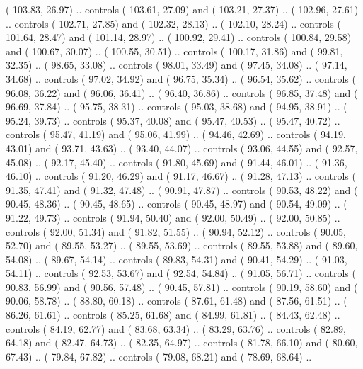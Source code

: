 {        ( 103.83,  26.97) .. controls ( 103.61,  27.09) and ( 103.21,  27.37) ..
        ( 102.96,  27.61) .. controls ( 102.71,  27.85) and ( 102.32,  28.13) ..
        ( 102.10,  28.24) .. controls ( 101.64,  28.47) and ( 101.14,  28.97) ..
        ( 100.92,  29.41) .. controls ( 100.84,  29.58) and ( 100.67,  30.07) ..
        ( 100.55,  30.51) .. controls ( 100.17,  31.86) and (  99.81,  32.35) ..
        (  98.65,  33.08) .. controls (  98.01,  33.49) and (  97.45,  34.08) ..
        (  97.14,  34.68) .. controls (  97.02,  34.92) and (  96.75,  35.34) ..
        (  96.54,  35.62) .. controls (  96.08,  36.22) and (  96.06,  36.41) ..
        (  96.40,  36.86) .. controls (  96.85,  37.48) and (  96.69,  37.84) ..
        (  95.75,  38.31) .. controls (  95.03,  38.68) and (  94.95,  38.91) ..
        (  95.24,  39.73) .. controls (  95.37,  40.08) and (  95.47,  40.53) ..
        (  95.47,  40.72) .. controls (  95.47,  41.19) and (  95.06,  41.99) ..
        (  94.46,  42.69) .. controls (  94.19,  43.01) and (  93.71,  43.63) ..
        (  93.40,  44.07) .. controls (  93.06,  44.55) and (  92.57,  45.08) ..
        (  92.17,  45.40) .. controls (  91.80,  45.69) and (  91.44,  46.01) ..
        (  91.36,  46.10) .. controls (  91.20,  46.29) and (  91.17,  46.67) ..
        (  91.28,  47.13) .. controls (  91.35,  47.41) and (  91.32,  47.48) ..
        (  90.91,  47.87) .. controls (  90.53,  48.22) and (  90.45,  48.36) ..
        (  90.45,  48.65) .. controls (  90.45,  48.97) and (  90.54,  49.09) ..
        (  91.22,  49.73) .. controls (  91.94,  50.40) and (  92.00,  50.49) ..
        (  92.00,  50.85) .. controls (  92.00,  51.34) and (  91.82,  51.55) ..
        (  90.94,  52.12) .. controls (  90.05,  52.70) and (  89.55,  53.27) ..
        (  89.55,  53.69) .. controls (  89.55,  53.88) and (  89.60,  54.08) ..
        (  89.67,  54.14) .. controls (  89.83,  54.31) and (  90.41,  54.29) ..
        (  91.03,  54.11) .. controls (  92.53,  53.67) and (  92.54,  54.84) ..
        (  91.05,  56.71) .. controls (  90.83,  56.99) and (  90.56,  57.48) ..
        (  90.45,  57.81) .. controls (  90.19,  58.60) and (  90.06,  58.78) ..
        (  88.80,  60.18) .. controls (  87.61,  61.48) and (  87.56,  61.51) ..
        (  86.26,  61.61) .. controls (  85.25,  61.68) and (  84.99,  61.81) ..
        (  84.43,  62.48) .. controls (  84.19,  62.77) and (  83.68,  63.34) ..
        (  83.29,  63.76) .. controls (  82.89,  64.18) and (  82.47,  64.73) ..
        (  82.35,  64.97) .. controls (  81.78,  66.10) and (  80.60,  67.43) ..
        (  79.84,  67.82) .. controls (  79.08,  68.21) and (  78.69,  68.64) ..
}
